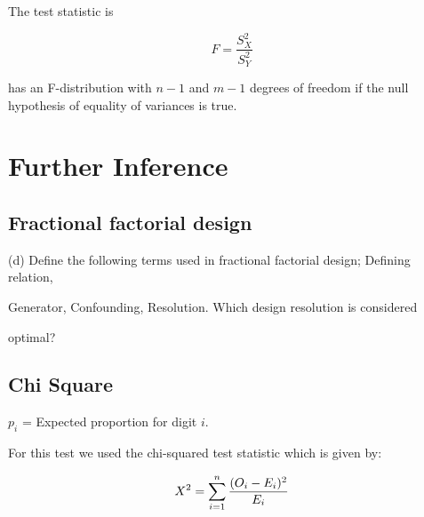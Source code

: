 The test statistic is

 

\begin{equation} F = \frac{S_X^2}{S_Y^2}\end{equation}

 

has an F-distribution with $n-1$ and $m-1$ degrees of freedom if the null hypothesis of equality of variances is true.

 



\chapter{Further Inference}

 

\section{Fractional factorial design}

 

(d)          Define the following terms used in fractional factorial design; Defining relation,

                Generator, Confounding, Resolution. Which design resolution is considered

                optimal?

 










\section{Chi Square}

 



$p_{i}$ = Expected proportion for digit $i$.

 

For this test we used the chi-squared test statistic which is given by:

\begin{equation}

X^2 = \sum_{i=1}^{n} {(O_i - E_i)^2 \over E_i}

\end{equation}

